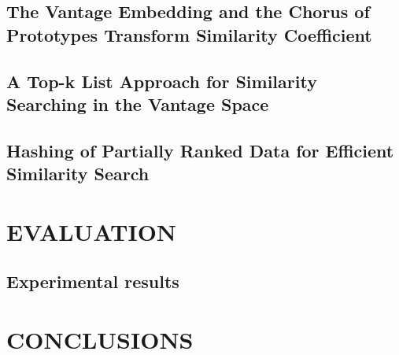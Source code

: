 \documentclass[
	12pt, %
]{fphw}
\begin{document}
\subsection{The Vantage Embedding and the Chorus of Prototypes Transform Similarity Coefficient} 
\subsection{A Top-k List Approach for Similarity Searching in the Vantage Space}
\subsection{Hashing of Partially Ranked Data for Efficient Similarity Search} 
\section{EVALUATION}
\subsection{Experimental results} 
\section{CONCLUSIONS}


\end{document}
